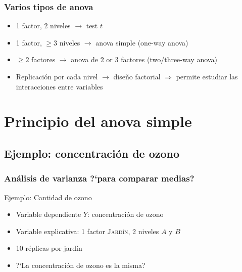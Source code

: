 \documentclass[mathserif]{beamer}
\begin{document}
\begin{frame}[label=anov8]
   \frametitle{Varios tipos de anova}
    \begin{itemize}[<+-| handout:1>]
      \item 1 factor, 2 niveles $\rightarrow$ test $t$
      \item 1 factor, $\geq 3$ niveles $\rightarrow$ anova simple (one-way anova)
      \item $\geq 2$ factores $\rightarrow$ anova de 2 or 3 factores (two/three-way anova)
      \item Replicaci\'on por cada nivel $\rightarrow$ dise\~no factorial $\Rightarrow$ permite estudiar las interacciones entre variables
   \end{itemize}
\end{frame}%



\section[Anova simple]{Principio del anova simple}

\subsection[Ejemplo: ozono]{Ejemplo: concentraci\'on de ozono}

\begin{frame}[label=anov9]
   \frametitle{An\'alisis de varianza ?`para comparar medias?}
   \begin{exampleblock}{Ejemplo: Cantidad de ozono}
      \begin{itemize}
         \item Variable dependiente $Y$: concentraci\'on de ozono
         \item Variable explicativa: 1 factor \textsc{Jard\'in}, 2 niveles $A$ y $B$
         \item 10 r\'eplicas por jard\'in
         \medskip
         \item ?`La concentraci\'on de  ozono es la misma?
      \end{itemize}
   \end{exampleblock}
\end{frame}%
\end{document}
